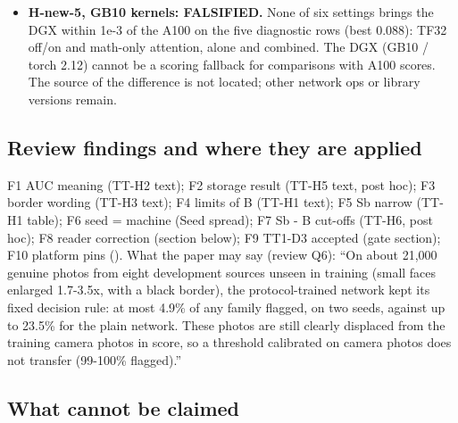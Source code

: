 \documentclass[10pt,twocolumn,letterpaper]{article}
\providecommand{\tightlist}{\setlength{\itemsep}{0pt}\setlength{\parskip}{0pt}}
\begin{document}
\begin{itemize}
  \begin{itemize}
  \tightlist
  \item
    The ladder R4 and AF0 u50 misses are at the floor (0-0.6\%) for every network. The miss mean is driven by the splice pool: Sb misses 25-26\% of splices against 93-97\% for A, B, C, Bv.
  \item
    So the negative \(\rho\) is ``Sb flags more genuine photos and misses fewer splices''. It is not a B-against-A trade: B's development misses equal A's within 1 point (0.322-0.324 against 0.312-0.315).
  \end{itemize}
\item
  \textbf{H-new-5, GB10 kernels: FALSIFIED.} None of six settings brings the DGX within 1e-3 of the A100 on the five diagnostic rows (best 0.088): TF32 off/on and math-only attention, alone and combined. The DGX (GB10 / torch 2.12) cannot be a scoring fallback for comparisons with A100 scores. The source of the difference is not located; other network ops or library versions remain.
\end{itemize}

\subsection{Review findings and where they are applied}\label{review-findings-and-where-they-are-applied}

F1 AUC meaning (TT-H2 text); F2 storage result (TT-H5 text, post hoc); F3 border wording (TT-H3 text); F4 limits of B (TT-H1 text); F5 Sb narrow (TT-H1 table); F6 seed = machine (Seed spread); F7 Sb - B cut-offs (TT-H6, post hoc); F8 reader correction (section below); F9 TT1-D3 accepted (gate section); F10 platform pins (\protect{}). What the paper may say (review Q6): ``On about 21,000 genuine photos from eight development sources unseen in training (small faces enlarged 1.7-3.5x, with a black border), the protocol-trained network kept its fixed decision rule: at most 4.9\% of any family flagged, on two seeds, against up to 23.5\% for the plain network. These photos are still clearly displaced from the training camera photos in score, so a threshold calibrated on camera photos does not transfer (99-100\% flagged).''

\subsection{What cannot be claimed}\label{what-cannot-be-claimed}
\end{document}

